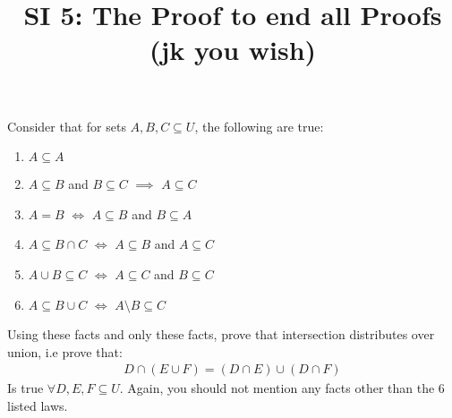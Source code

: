 \documentclass[12pt]{article}
\date{}
\author{}
\title{SI 5: The Proof to end all Proofs (jk you wish)}
\begin{document}
	\maketitle
	Consider that for sets $A,B,C \subseteq U$, the following are true:
	
	\begin{enumerate}
		\item $A \subseteq A$
		\item $A \subseteq B$ and $B \subseteq C$ $\implies$ $ A \subseteq C$
		\item $A = B$ $\iff$ $A\subseteq B$ and $B\subseteq A$
		\item $A \subseteq B \cap C$ $\iff$ $ A \subseteq B$ and $A \subseteq C$
		\item $A \cup B \subseteq C$ $\iff$ $A\subseteq C$ and $B \subseteq C$
		\item $A \subseteq B \cup C$ $\iff$ $A \setminus B \subseteq C$
	\end{enumerate}
	Using these facts and only these facts, prove that intersection distributes over union, i.e prove that:
	\begin{align*}
		D \cap (E \cup F) = (D \cap E) \cup (D \cap F)
	\end{align*}
	Is true $\forall D,E,F\subseteq U$. Again, you should not mention any facts other than the 6 listed laws.
\end{document}
